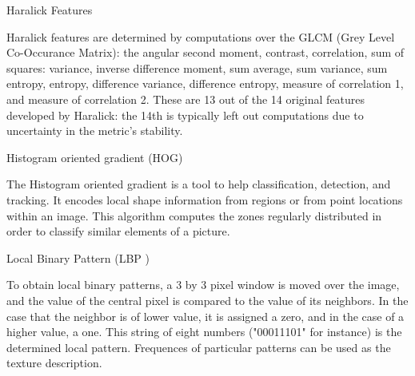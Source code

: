 
Haralick Features

Haralick features are determined by computations over the GLCM (Grey Level Co-Occurance Matrix): the angular second moment, contrast, correlation, sum of squares: variance, inverse difference moment, sum average, sum variance, sum entropy, entropy, difference variance, difference entropy, measure of correlation 1, and measure of correlation 2. These are 13 out of the 14 original features developed by Haralick: the 14th is typically left out computations due to uncertainty in the metric's stability. 

Histogram oriented gradient (HOG)

The Histogram oriented gradient is a tool to help classification, detection, and tracking. It encodes local shape information from regions or from point locations within an image. This algorithm computes the zones regularly distributed in order to classify similar elements of a picture.

Local Binary Pattern (LBP )

To obtain local binary patterns, a 3 by 3 pixel window is moved over the image, and the value of the central pixel is compared to the value of its neighbors. In the case that the neighbor is of lower value, it is assigned a zero, and in the case of a higher value, a one. This string of eight numbers ("00011101" for instance) is the determined local pattern. Frequences of particular patterns can be used as the texture description. 
  
  
  